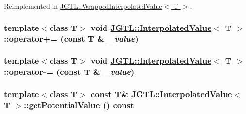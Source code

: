 Reimplemented in \hyperlink{class_j_g_t_l_1_1_wrapped_interpolated_value_1cc76107e67afe602b384a1ecc9e2840}{JGTL::Wrapped\-Interpolated\-Value$<$ T $>$}.\hypertarget{class_j_g_t_l_1_1_interpolated_value_58856554c17b6b4b815e2e74e0dc5b5b}{
\subsubsection[operator+=]{\setlength{\rightskip}{0pt plus 5cm}template$<$class T$>$ void \hyperlink{class_j_g_t_l_1_1_interpolated_value}{JGTL::Interpolated\-Value}$<$ T $>$::operator+= (const T \& {\em \_\-value})}}
\label{class_j_g_t_l_1_1_interpolated_value_58856554c17b6b4b815e2e74e0dc5b5b}


\hypertarget{class_j_g_t_l_1_1_interpolated_value_d8cd429d3c46e1a49c5791a60deb7570}{
\subsubsection[operator-=]{\setlength{\rightskip}{0pt plus 5cm}template$<$class T$>$ void \hyperlink{class_j_g_t_l_1_1_interpolated_value}{JGTL::Interpolated\-Value}$<$ T $>$::operator-= (const T \& {\em \_\-value})}}
\label{class_j_g_t_l_1_1_interpolated_value_d8cd429d3c46e1a49c5791a60deb7570}


\hypertarget{class_j_g_t_l_1_1_interpolated_value_a3f9c94d927a923eaab2d6cec96d4dd7}{
\subsubsection[getPotentialValue]{\setlength{\rightskip}{0pt plus 5cm}template$<$class T$>$ const T\& \hyperlink{class_j_g_t_l_1_1_interpolated_value}{JGTL::Interpolated\-Value}$<$ T $>$::get\-Potential\-Value () const}}
\label{class_j_g_t_l_1_1_interpolated_value_a3f9c94d927a923eaab2d6cec96d4dd7}


